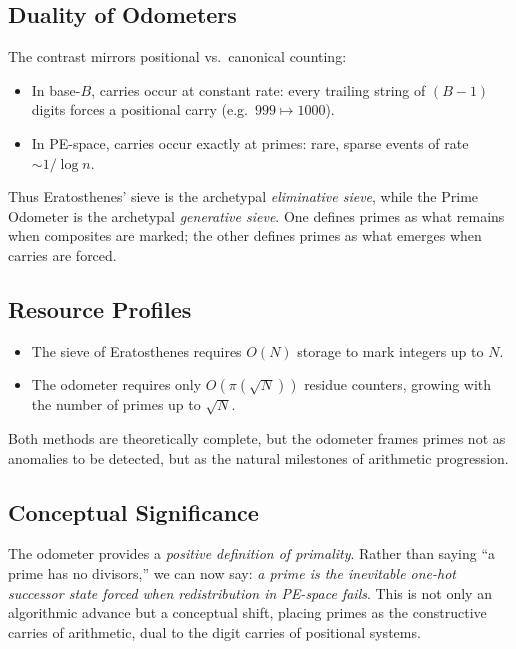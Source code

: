 \documentclass[12pt]{article}
\theoremstyle{definition}
\theoremstyle{remark}
\begin{document}
\subsection{Duality of Odometers}

The contrast mirrors positional vs.\ canonical counting:

\begin{itemize}
  \item In base-$B$, carries occur at constant rate: every trailing string of $(B-1)$ digits forces
        a positional carry (e.g.\ $999 \mapsto 1000$).
  \item In PE-space, carries occur exactly at primes: rare, sparse events of rate $\sim 1/\log n$.
\end{itemize}

Thus Eratosthenes’ sieve is the archetypal \emph{eliminative sieve}, while the Prime Odometer is
the archetypal \emph{generative sieve}. One defines primes as what remains when composites are
marked; the other defines primes as what emerges when carries are forced.

\subsection{Resource Profiles}

\begin{itemize}
  \item The sieve of Eratosthenes requires $O(N)$ storage to mark integers up to $N$.
  \item The odometer requires only $O(\pi(\sqrt{N}))$ residue counters, growing with the number of
        primes up to $\sqrt{N}$.
\end{itemize}

Both methods are theoretically complete, but the odometer frames primes not as anomalies to be
detected, but as the natural milestones of arithmetic progression.

\subsection{Conceptual Significance}

The odometer provides a \emph{positive definition of primality}. Rather than saying ``a prime has
no divisors,'' we can now say: \emph{a prime is the inevitable one-hot successor state forced when
redistribution in PE-space fails}. This is not only an algorithmic advance but a conceptual shift,
placing primes as the constructive carries of arithmetic, dual to the digit carries of positional
systems.
\end{document}
